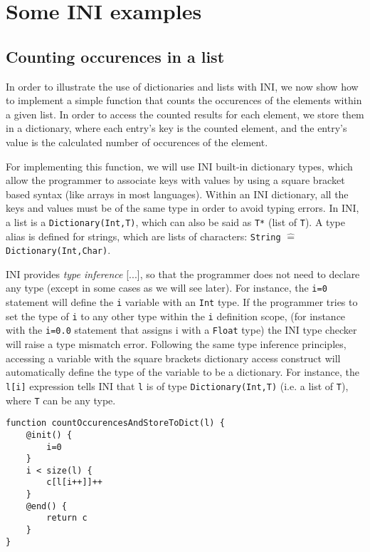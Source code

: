 \documentclass[11pt]{report}
\begin{document}
\chapter{Some INI examples}

\section{Counting occurences in a list\label{sec:counting_occurences_in_a_list}}

In order to illustrate the use of dictionaries and lists with INI, we now show how to implement a simple function that counts the occurences of the elements within a given list. In order to access the counted results for each element, we store them in a dictionary, where each entry's key is the counted element, and the entry's value is the calculated number of occurences of the element.

For implementing this function, we will use INI built-in dictionary types, which allow the programmer to associate keys with values by using a square bracket based syntax (like arrays in most languages). Within an INI dictionary, all the keys and values must be of the same type in order to avoid typing errors. In INI, a list is a \texttt{Dictionary(Int,T)}, which can also be said as \texttt{T*} (list of \texttt{T}). A type alias is defined for strings, which are lists of characters: \texttt{String} $\widehat=$ \texttt{Dictionary(Int,Char)}.

INI provides \emph{type inference} [...], so that the programmer does not need to declare any type (except in some cases as we will see later). For instance, the \texttt{i=0} statement will define the \texttt{i} variable with an \texttt{Int} type. If the programmer tries to set the type of \texttt{i} to any other type within the \texttt{i} definition scope, (for instance with the \texttt{i=0.0} statement that assigns i with a \texttt{Float} type) the INI type checker will raise a type mismatch error. Following the same type inference principles, accessing a variable with the square brackets dictionary access construct will automatically define the type of the variable to be a dictionary. For instance, the \texttt{l[i]} expression tells INI that \texttt{l} is of type \texttt{Dictionary(Int,T)} (i.e. a list of \texttt{T}), where \texttt{T} can be any type.

\begin{lstlisting}
function countOccurencesAndStoreToDict(l) {
	@init() {
		i=0
	}
	i < size(l) {
		c[l[i++]]++
	}
	@end() {
		return c
	}
}
\end{lstlisting}
\end{document}
